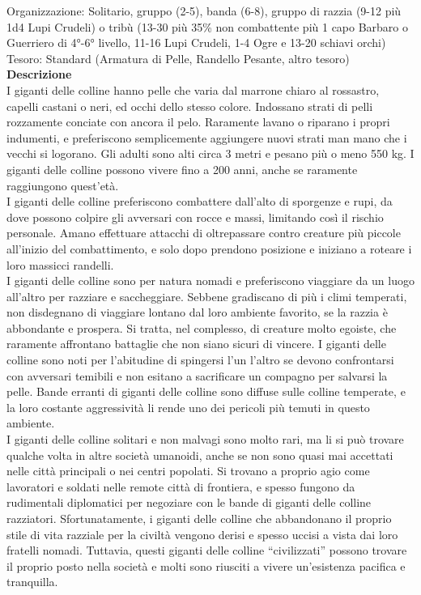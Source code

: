 \begin{multicols}{2}
Organizzazione: Solitario, gruppo (2-5), banda (6-8), gruppo di razzia (9-12 più 1d4 Lupi Crudeli) o tribù (13-30 più 35\% non combattente più 1 capo Barbaro o Guerriero di 4°-6° livello, 11-16 Lupi Crudeli, 1-4 Ogre e 13-20 schiavi orchi)\\
Tesoro: Standard (Armatura di Pelle, Randello Pesante, altro tesoro)\\
\textbf{Descrizione}\\
I giganti delle colline hanno pelle che varia dal marrone chiaro al rossastro, capelli castani o neri, ed occhi dello stesso colore. Indossano strati di pelli rozzamente conciate con ancora il pelo. Raramente lavano o riparano i propri indumenti, e preferiscono semplicemente aggiungere nuovi strati man mano che i vecchi si logorano. Gli adulti sono alti circa 3 metri e pesano più o meno 550 kg. I giganti delle colline possono vivere fino a 200 anni, anche se raramente raggiungono quest’età.\\
I giganti delle colline preferiscono combattere dall’alto di sporgenze e rupi, da dove possono colpire gli avversari con rocce e massi, limitando così il rischio personale. Amano effettuare attacchi di oltrepassare contro creature più piccole all’inizio del combattimento, e solo dopo prendono posizione e iniziano a roteare i loro massicci randelli.\\
I giganti delle colline sono per natura nomadi e preferiscono viaggiare da un luogo all’altro per razziare e saccheggiare. Sebbene gradiscano di più i climi temperati, non disdegnano di viaggiare lontano dal loro ambiente favorito, se la razzia è abbondante e prospera. Si tratta, nel complesso, di creature molto egoiste, che raramente affrontano battaglie che non siano sicuri di vincere. I giganti delle colline sono noti per l’abitudine di spingersi l’un l’altro se devono confrontarsi con avversari temibili e non esitano a sacrificare un compagno per salvarsi la pelle. Bande erranti di giganti delle colline sono diffuse sulle colline temperate, e la loro costante aggressività li rende uno dei pericoli più temuti in questo ambiente.\\

I giganti delle colline solitari e non malvagi sono molto rari, ma li si può trovare qualche volta in altre società umanoidi, anche se non sono quasi mai accettati nelle città principali o nei centri popolati. Si trovano a proprio agio come lavoratori e soldati nelle remote città di frontiera, e spesso fungono da rudimentali diplomatici per negoziare con le bande di giganti delle colline razziatori. Sfortunatamente, i giganti delle colline che abbandonano il proprio stile di vita razziale per la civiltà vengono derisi e spesso uccisi a vista dai loro fratelli nomadi. Tuttavia, questi giganti delle colline “civilizzati” possono trovare il proprio posto nella società e molti sono riusciti a vivere un’esistenza pacifica e tranquilla.\\


\end{multicols}
